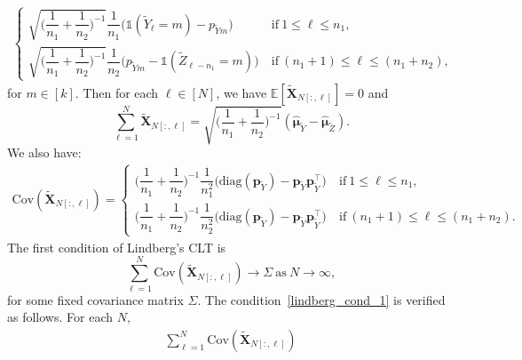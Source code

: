 \documentclass[twoside,11pt]{article}
\newcommand{\rvTwo}{Y}
\newcommand{\rvThree}{Z}
\newcommand{\vectorize}[1]{\mathbf{#1}}
\newcommand{\rvX}{X} %
\newcommand{\rVecX}{\vectorize{\rvX}}
\newcommand{\rvY}{Y}
\newcommand{\rvZ}{Z}
\newcommand{\mE}{\mathbb{E}} %
\newcommand{\alphabetSize}{k} %
\newcommand{\vectorIndex}{m}
\newcommand{\sampleSize}{n}
\newcommand{\probVecElement}[2]{p_{{#1}{#2}}}
\newcommand{\probVec}{\mathbf{p}} %
\begin{document}
\begin{appendix}
\begin{align*}
		\begin{cases}
			\sqrt{\biggl( \dfrac{1}{\sampleSize_1}+\dfrac{1}{\sampleSize_2} \biggr)^{-1}}
			\dfrac{1}{\sampleSize_1}
			\bigl(
			\mathds{1}(\tilde{\rvTwo}_\ell = \vectorIndex)
			-
			\probVecElement{\tilde{\rvTwo}}{\vectorIndex}
			\bigr)
			~&\text{if}~
			1 \leq \ell \leq \sampleSize_1,
			\\
			\sqrt{\biggl( \dfrac{1}{\sampleSize_1}+\dfrac{1}{\sampleSize_2} \biggr)^{-1}}
			\dfrac{1}{\sampleSize_2}
			\bigl(
			\probVecElement{\tilde{\rvTwo}}{\vectorIndex}
			-
			\mathds{1}
			(\tilde{\rvThree}_{\ell-\sampleSize_1} = \vectorIndex)
			\bigr)
			~&\text{if}~
			(\sampleSize_1 + 1) \leq \ell \leq ( \sampleSize_1 + \sampleSize_2),
		\end{cases}
	\end{align*}
	for $\vectorIndex \in [\alphabetSize]$. 
	Then for each $\ell \in [N]$, we have $\mE[\tilde{\rVecX}_{N[:,\ell]}] = 0$  and
	$$\sum_{\ell=1}^N \tilde{\rVecX}_{N[:,\ell]} = 
	\sqrt{\biggl( \dfrac{1}{\sampleSize_1}+\dfrac{1}{\sampleSize_2} \biggr)^{-1}}(
	\hat{\boldsymbol{\mu}}_{\tilde{\rvY}}
	-
	\hat{\boldsymbol{\mu}}_{\tilde{\rvZ}}).
	$$
	We also have:
	\begin{align*}
		\mathrm{Cov}(\tilde{\rVecX}_{N[:,\ell]})
		=
		\begin{cases}
			\biggl( \dfrac{1}{\sampleSize_1}+\dfrac{1}{\sampleSize_2} \biggr)^{-1}
			\dfrac{1}{\sampleSize_1^2}
			\bigl(
			\text{diag}(\probVec_{\tilde{\rvTwo}}) - \probVec_{\tilde{\rvTwo}} \probVec_{\tilde{\rvTwo}}^\top
			\bigr)
			~&\text{if}~
			1 \leq \ell \leq \sampleSize_1,
			\\
			\biggl( \dfrac{1}{\sampleSize_1}+\dfrac{1}{\sampleSize_2} \biggr)^{-1}
			\dfrac{1}{\sampleSize_2^2}
			\bigl(
			\text{diag}(\probVec_{\tilde{\rvTwo}}) - \probVec_{\tilde{\rvTwo}} \probVec_{\tilde{\rvTwo}}^\top
			\bigr)
			~&\text{if}~
			(\sampleSize_1 + 1) \leq \ell \leq ( \sampleSize_1 + \sampleSize_2).
		\end{cases}
	\end{align*}
	The first condition of Lindberg's CLT is
	\begin{equation}\label{lindberg_cond_1}
		\sum_{\ell=1}^N\mathrm{Cov}(\tilde{\rVecX}_{N[:,\ell]}) \to \Sigma~\text{as}~N \to \infty,
	\end{equation}
	for some fixed covariance matrix $\Sigma$. The condition~\eqref{lindberg_cond_1} is verified as follows. For each $N$,
	\begin{align*}
		\sum_{\ell=1}^N \mathrm{Cov}(\tilde{\rVecX}_{N[:,\ell]})

\end{align*}
\end{appendix}
\end{document}
